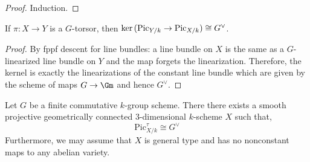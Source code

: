 \documentclass[12pt]{article}
\begin{document}
\begin{proof}
Induction.
\end{proof}

\begin{lemma}
If $\pi : X \to Y$ is a $G$-torsor, then $\ker{(\mathrm{Pic}_{Y/k} \to \mathrm{Pic}_{X/k})} \cong G^\vee$.
\end{lemma}

\begin{proof}
By fppf descent for line bundles: a line bundle on $X$ is the same as a $G$-linearized line bundle on $Y$ and the map forgets the linearization. Therefore, the kernel is exactly the linearizations of the constant line bundle which are given by the scheme of maps $G \to \Gm$ and hence $G^\vee$.
\end{proof}

\begin{thm}
Let $G$ be a finite commutative $k$-group scheme. There there exists a smooth projective geometrically connected $3$-dimensional $k$-scheme $X$ such that,
\[ \mathrm{Pic}^{\tau}_{X/k} \cong G^\vee \]
Furthermore, we may assume that $X$ is general type and has no nonconstant maps to any abelian variety.
\end{thm}
\end{document}

